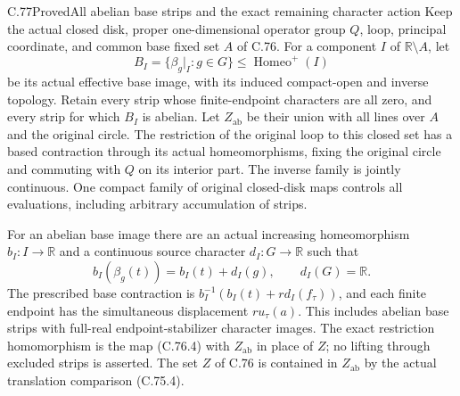 \begin{claim}{C.77}{Proved}{All abelian base strips and the exact remaining character action}
Keep the actual closed disk, proper one-dimensional
operator group $Q$, loop, principal coordinate, and
common base fixed set $A$ of C.76. For a component
$I$ of $\mathbb R\setminus A$, let
\[
        B_I=\{\beta_g|_I:g\in G\}
                    \leq\operatorname{Homeo}^+(I)
                                                               \tag{C.77.1}
\]
be its actual effective base image, with its induced
compact-open and inverse topology. Retain every strip
whose finite-endpoint characters are all zero, and
every strip for which $B_I$ is abelian. Let $Z_{\mathrm{ab}}$
be their union with all lines over $A$ and the original
circle. The restriction of the original loop to this
closed set has a based contraction through its actual
homeomorphisms, fixing the original circle and commuting
with $Q$ on its interior part. The inverse family is
jointly continuous. One compact family of original
closed-disk maps controls all evaluations, including
arbitrary accumulation of strips.

For an abelian base image there are an actual increasing
homeomorphism $b_I:I\to\mathbb R$ and a continuous
source character $d_I:G\to\mathbb R$ such that
\[
 b_I(\beta_g(t))=b_I(t)+d_I(g),\qquad
                         d_I(G)=\mathbb R.
                                                               \tag{C.77.2}
\]
The prescribed base contraction is
$b_I^{-1}(b_I(t)+r d_I(f_\tau))$, and each finite endpoint
has the simultaneous displacement $r u_\tau(a)$.
This includes abelian base strips with full-real
endpoint-stabilizer character images. The exact
restriction homomorphism is the map (C.76.4) with
$Z_{\mathrm{ab}}$ in place of $Z$; no lifting through
excluded strips is asserted. The set $Z$ of C.76 is
contained in $Z_{\mathrm{ab}}$ by the actual translation
comparison (C.75.4).


\end{claim}
